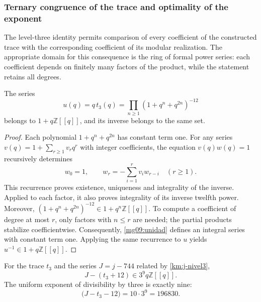 \subsubsection{Ternary congruence of the trace and optimality of the exponent}
\label{mg09:congruencia}

The level-three identity permits comparison of every coefficient of
the constructed trace with the corresponding coefficient of its modular
realization. The appropriate domain for this consequence is the ring
of formal power series: each coefficient depends on finitely many
factors of the product, while the statement retains all degrees.

\begin{lemma}
The series
\begin{equation}
 u(q)=q\,t_3(q)=\prod_{n\geq1}(1+q^n+q^{2n})^{-12}
 \label{mg09:unidad}
\end{equation}
belongs to \(1+q\mathbb Z[[q]]\), and its inverse belongs to the
same set.
\end{lemma}

\begin{proof}
Each polynomial \(1+q^n+q^{2n}\) has constant term one. For any
series \(v(q)=1+\sum_{r\geq1}v_rq^r\) with integer
coefficients, the equation \(v(q)w(q)=1\) recursively determines
\[
 w_0=1,\qquad w_r=-\sum_{i=1}^{r}v_iw_{r-i}\quad(r\geq1).
\]
This recurrence proves existence, uniqueness and integrality of the
inverse. Applied to each factor, it also proves integrality of its
inverse twelfth power. Moreover,
\((1+q^n+q^{2n})^{-12}\in1+q^n\mathbb Z[[q]]\).
To compute a coefficient of degree at most \(r\), only factors
with \(n\leq r\) are needed; the partial products stabilize
coefficientwise. Consequently, \eqref{mg09:unidad} defines an
integral series with constant term one. Applying the same recurrence
to \(u\) yields \(u^{-1}\in1+q\mathbb Z[[q]]\).
\end{proof}

\begin{proposition}
For the trace \(t_3\) and the series \(J=j-744\) related by
\eqref{km:j-nivel3},
\begin{equation}
 J-(t_3+12)\in3^9q\mathbb Z[[q]].
 \label{mg09:congruencia-exacta}
\end{equation}
The uniform exponent of divisibility by three is exactly nine:
\begin{equation}
 [q]\bigl(J-t_3-12\bigr)=10\cdot3^9=196830.
 \label{mg09:optimalidad}
\end{equation}
\end{proposition}

